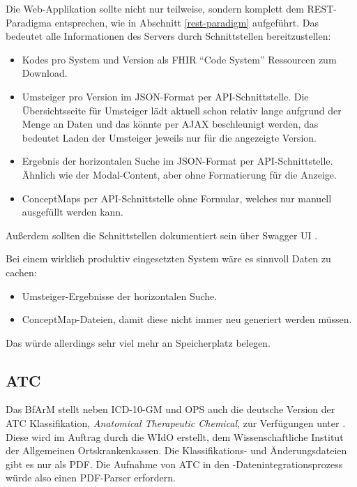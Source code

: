 Die Web-Applikation sollte nicht nur teilweise, sondern komplett dem REST-Paradigma entsprechen, wie in Abschnitt \ref{rest-paradigm} aufgeführt. Das bedeutet alle Informationen des Servers durch Schnittstellen bereitzustellen: 

\begin{itemize}
\item Kodes pro System und Version als FHIR "`Code System"' Ressourcen zum Download.
\item Umsteiger pro Version im JSON-Format per API-Schnittstelle. Die Übersichtsseite für Umsteiger lädt aktuell schon relativ lange aufgrund der Menge an Daten und das könnte per AJAX beschleunigt werden, das bedeutet Laden der Umsteiger jeweils nur für die angezeigte Version. 
\item Ergebnis der horizontalen Suche im JSON-Format per API-Schnittstelle. Ähnlich wie der Modal-Content, aber ohne Formatierung für die Anzeige.
\item ConceptMaps per API-Schnittstelle ohne Formular, welches nur manuell ausgefüllt werden kann. 
\end{itemize}

Außerdem sollten die Schnittstellen dokumentiert sein über Swagger UI \cite{swagger}.

Bei einem wirklich produktiv eingesetzten System wäre es sinnvoll Daten zu cachen:

\begin{itemize}
\item Umsteiger-Ergebnisse der horizontalen Suche. 
\item ConceptMap-Dateien, damit diese nicht immer neu generiert werden müssen. 
\end{itemize}

Das würde allerdings sehr viel mehr an Speicherplatz belegen. 

\subsection{ATC}

Das BfArM stellt neben ICD-10-GM und OPS auch die deutsche Version der ATC Klassifikation, \emph{Anatomical Therapeutic Chemical}, zur Verfügungen unter \cite{bfarmatc}. Diese wird im Auftrag durch die WIdO erstellt, dem Wissenschaftliche Institut der Allgemeinen Ortskrankenkassen. Die Klassifikations- und Änderungsdateien gibt es nur als PDF. Die Aufnahme von ATC in den \bfarmer-Datenintegrationsprozess würde also einen PDF-Parser erfordern. 

